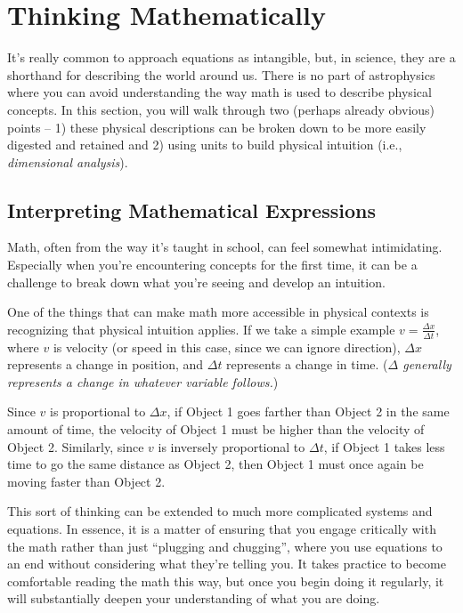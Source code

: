 \section{Thinking Mathematically}

It's really common to approach equations as intangible, but, in science, they are a shorthand for describing the world around us. There is no part of astrophysics where you can avoid understanding the way math is used to describe physical concepts. In this section, you will walk through two (perhaps already obvious) points -- 1) these physical descriptions can be broken down to be more easily digested and retained and 2) using units to build physical intuition (i.e., \textit{dimensional analysis}).

\subsection{Interpreting Mathematical Expressions}

Math, often from the way it's taught in school, can feel somewhat intimidating. Especially when you're encountering concepts for the first time, it can be a challenge to break down what you're seeing and develop an intuition.

One of the things that can make math more accessible in physical contexts is recognizing that physical intuition applies. If we take a simple example $v = \frac{\Delta x}{\Delta t}$, where $v$ is velocity (or speed in this case, since we can ignore direction), $\Delta x$ represents a change in position, and $\Delta t$ represents a change in time. (\emph{$\Delta$ generally represents a change in whatever variable follows.})

Since $v$ is proportional to $\Delta x$, if Object 1 goes farther than Object 2 in the same amount of time, the velocity of Object 1 must be higher than the velocity of Object 2. Similarly, since $v$ is inversely proportional to $\Delta t$, if Object 1 takes less time to go the same distance as Object 2, then Object 1 must once again be moving faster than Object 2.

This sort of thinking can be extended to much more complicated systems and equations. In essence, it is a matter of ensuring that you engage critically with the math rather than just ``plugging and chugging'', where you use equations to an end without considering what they're telling you. It takes practice to become comfortable reading the math this way, but once you begin doing it regularly, it will substantially deepen your understanding of what you are doing.

